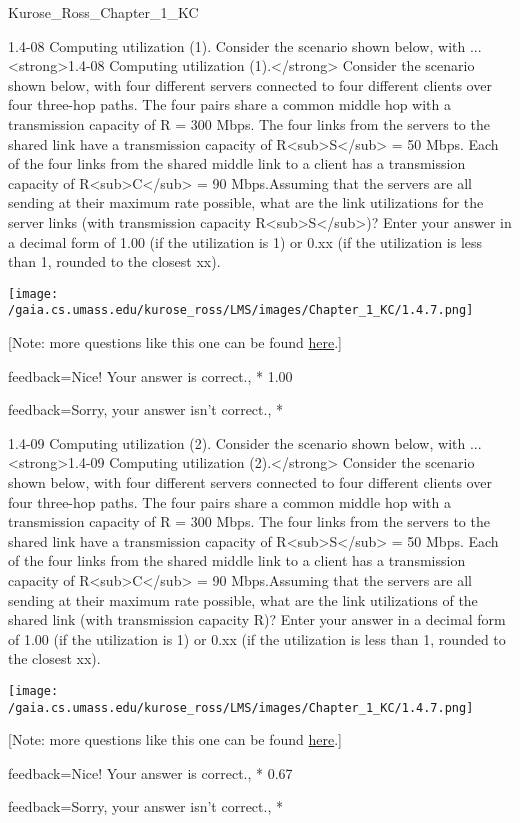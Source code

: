 \documentclass[a4paper,twocolumn]{article}
\begin{document}
\begin{quiz}{Kurose_Ross_Chapter_1_KC}
\begin{shortanswer}[
	points=1,
	penalty=0.33333,
]{1.4-08 Computing utilization (1). Consider the scenario shown below, with ...}
<strong>1.4-08 Computing utilization (1).</strong> Consider the scenario shown below, with four different servers connected to four different clients over four three-hop paths. The four pairs share a common middle hop with a transmission capacity of R = 300 Mbps. The four links from the servers to the shared link have a transmission capacity of R<sub>S</sub> = 50 Mbps. Each of the four links from the shared middle link to a client has a transmission capacity of R<sub>C</sub> = 90 Mbps.Assuming that the servers are all sending at their maximum rate possible, what are the link utilizations for the server links (with transmission capacity R<sub>S</sub>)? Enter your answer in a decimal form of 1.00 (if the utilization is 1) or 0.xx (if the utilization is less than 1, rounded to the closest xx). 
\begin{center}
\texttt{[image: /gaia.cs.umass.edu/kurose\_ross/LMS/images/Chapter\_1\_KC/1.4.7.png]}
\end{center}
 [Note: more questions like this one can be found \href{http://gaia.cs.umass.edu/kurose_ross/interactive/end-end-throughput-simple.php}{here}.]
\item[feedback={Nice!  Your answer is correct.},]* 1.00
\item[feedback={Sorry, your answer isn't correct.},] *
\end{shortanswer}

\begin{shortanswer}[
	points=1,
	penalty=0.33333,
]{1.4-09 Computing utilization (2). Consider the scenario shown below, with ...}
<strong>1.4-09 Computing utilization (2).</strong> Consider the scenario shown below, with four different servers connected to four different clients over four three-hop paths. The four pairs share a common middle hop with a transmission capacity of R = 300 Mbps. The four links from the servers to the shared link have a transmission capacity of R<sub>S</sub> = 50 Mbps. Each of the four links from the shared middle link to a client has a transmission capacity of R<sub>C</sub> = 90 Mbps.Assuming that the servers are all sending at their maximum rate possible, what are the link utilizations of the shared link (with transmission capacity R)? Enter your answer in a decimal form of 1.00 (if the utilization is 1) or 0.xx (if the utilization is less than 1, rounded to the closest xx). 
\begin{center}
\texttt{[image: /gaia.cs.umass.edu/kurose\_ross/LMS/images/Chapter\_1\_KC/1.4.7.png]}
\end{center}
 [Note: more questions like this one can be found \href{http://gaia.cs.umass.edu/kurose_ross/interactive/end-end-throughput-simple.php}{here}.]
\item[feedback={Nice!  Your answer is correct.},]* 0.67
\item[feedback={Sorry, your answer isn't correct.},] *
\end{shortanswer}


\end{quiz}
\end{document}

